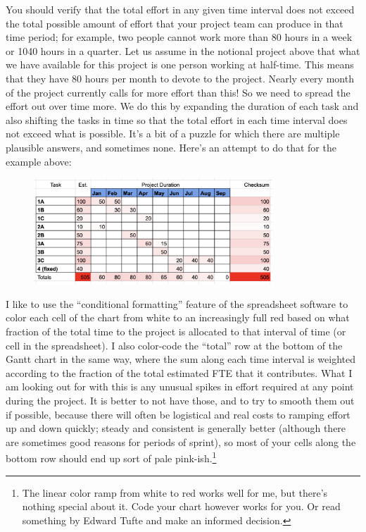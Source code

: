 \documentclass[12pt,oneside]{book}
\begin{document}
You should verify that the total effort in any given time interval does not exceed the total possible amount of effort that your project team can produce in that time period; for example, two people cannot work more than 80 hours in a week or 1040 hours in a quarter. Let us assume in the notional project above that what we have available for this project is one person working at half-time. This means that they have 80 hours per month to devote to the project. Nearly every month of the project currently calls for more effort than this! So we need to spread the effort out over time more. We do this by expanding the duration of each task and also shifting the tasks in time so that the total effort in each time interval does not exceed what is possible. It's a bit of a puzzle for which there are multiple plausible answers, and sometimes none. Here's an attempt to do that for the example above:

\begin{figure}[h]
\centering
\includegraphics[width=0.8\textwidth]{Plan_02.png}
\centering
\end{figure}

I like to use the ``conditional formatting'' feature of the spreadsheet software to color each cell of the chart from white to an increasingly full red based on what fraction of the total time to the project is allocated to that interval of time (or cell in the spreadsheet). I also color-code the ``total'' row at the bottom of the Gantt chart in the same way, where the sum along each time interval is weighted according to the fraction of the total estimated FTE that it contributes. What I am looking out for with this is any unusual spikes in effort required at any point during the project. It is better to not have those, and to try to smooth them out if possible, because there will often be logistical and real costs to ramping effort up and down quickly; steady and consistent is generally better (although there are sometimes good reasons for periods of sprint), so most of your cells along the bottom row should end up sort of pale pink-ish.\footnote{
The linear color ramp from white to red works well for me, but there's nothing special about it. Code your chart however works for you. Or read something by Edward Tufte and make an informed decision.}
\end{document}
